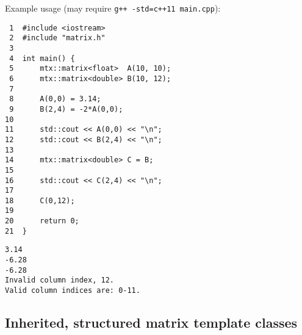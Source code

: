\documentclass[11pt]{article}
\begin{document}
Example usage (may require \texttt{g++ -std=c++11 main.cpp}):

\begin{verbatim}
 1  #include <iostream>
 2  #include "matrix.h"
 3  
 4  int main() {
 5      mtx::matrix<float>  A(10, 10);
 6      mtx::matrix<double> B(10, 12);
 7  
 8      A(0,0) = 3.14;
 9      B(2,4) = -2*A(0,0);
10  
11      std::cout << A(0,0) << "\n";
12      std::cout << B(2,4) << "\n";
13  
14      mtx::matrix<double> C = B;
15  
16      std::cout << C(2,4) << "\n";
17  
18      C(0,12);
19  
20      return 0;
21  }
\end{verbatim}

\begin{verbatim}
3.14
-6.28
-6.28
Invalid column index, 12.
Valid column indices are: 0-11.
\end{verbatim}

\subsection{Inherited, structured matrix template classes}
\label{sec:orgheadline61}
\end{document}
